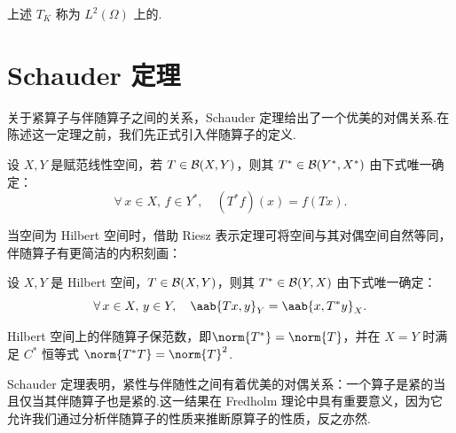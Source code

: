 \begin{definition}
上述 $T_K$ 称为 $L^2(\Omega)$ 上的.
\end{definition}

\section{Schauder 定理}

关于紧算子与伴随算子之间的关系，Schauder 定理给出了一个优美的对偶关系.在陈述这一定理之前，我们先正式引入伴随算子的定义.

\begin{definition}[伴随算子]
设 $X,Y$ 是赋范线性空间，若 $T\in\mathcal{B}(X,Y)$，则其 $T^*\in\mathcal{B}(Y^*,X^*)$ 由下式唯一确定：
\begin{equation*}
\forall\, x\in X,\, f\in Y^*,\quad (T^* f)(x) = f(Tx).
\end{equation*}
\end{definition}

当空间为 Hilbert 空间时，借助 Riesz 表示定理可将空间与其对偶空间自然等同，伴随算子有更简洁的内积刻画：

\begin{definition}
设 $X,Y$ 是 Hilbert 空间，$T\in\mathcal{B}(X,Y)$，则其 $T^*\in\mathcal{B}(Y,X)$ 由下式唯一确定：
\begin{equation*}
\forall\, x\in X,\, y\in Y,\quad \aab{Tx, y}_Y = \aab{x, T^*y}_X.
\end{equation*}
\end{definition}

\begin{note}
Hilbert 空间上的伴随算子保范数，即$\norm{T^*} = \norm{T}$，并在 $X=Y$ 时满足 $C^*$ 恒等式 $\norm{T^*T} = \norm{T}^2$.
\end{note}

Schauder 定理表明，紧性与伴随性之间有着优美的对偶关系：一个算子是紧的当且仅当其伴随算子也是紧的.这一结果在 Fredholm 理论中具有重要意义，因为它允许我们通过分析伴随算子的性质来推断原算子的性质，反之亦然.


